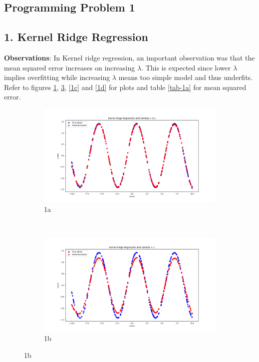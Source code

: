 \documentclass[a4paper,11pt]{article}
\begin{document}
\begin{mlsolution}
\section{Programming Problem 1}
\subsection{1. Kernel Ridge Regression}
\textbf{Observations}: In Kernel ridge regression, an important observation was that the mean squared error increases on increasing $\lambda$. This is expected since lower $\lambda$ implies overfitting while increasing $\lambda$ means too simple model and thus underfits. Refer to figures \ref{1a}, \ref{1b}, \ref{1c} and \ref{1d} for plots and table \ref{tab-1a} for mean squared error.
\begin{figure}[!htbp]
	\label{fig1a}
	\begin{subfigure}{0.5\textwidth}
		\centering
		\includegraphics[width=1.8\textwidth]{images/krr_0.png}
		\caption{1a}
		\label{1a}
	\end{subfigure}
\\
	\begin{subfigure}{0.5\textwidth}
		\centering
		\includegraphics[width=1.8\textwidth]{images/krr_1.png}
		\caption{1b}
		\label{1b}
	\end{subfigure}
\end{figure}


\end{mlsolution}
\end{document}
